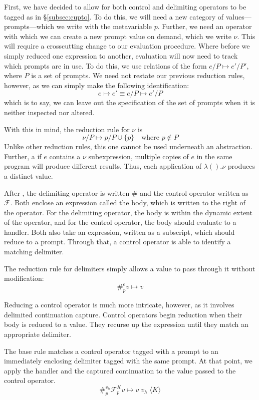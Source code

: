 \documentclass[11pt]{article}
\newcommand\F{\mathcal{F}}
\newcommand{\angles}[1]{\langle#1\rangle}
\begin{document}
First, we have decided to allow for both control and delimiting operators to be tagged as in \S\ref{subsec:cupto}.
To do this, we will need a new category of values---prompts---which we write with the metavariable $p$.
Further, we need an operator with which we can create a new prompt value on demand, which we write $\nu$.
This will require a crosscutting change to our evaluation procedure.
Where before we simply reduced one expression to another, evaluation will now need to track which prompts are in use.
To do this, we use relations of the form $e/P \mapsto e'/P'$, where $P$ is a set of prompts.
We need not restate our previous reduction rules, however, as we can simply make the following identification:
$$e \mapsto e' \equiv e/P \mapsto e'/P$$
which is to say, we can leave out the specification of the set of prompts when it is neither inspected nor altered.

With this in mind, the reduction rule for $\nu$ is
$$\nu/P \mapsto p/P\cup\{p\} \quad\textrm{where }p \notin P$$
Unlike other reduction rules, this one cannot be used underneath an abstraction.
Further, a if $e$ contains a $\nu$ subexpression, multiple copies of $e$ in the same program will produce different results.
Thus, each application of $\lambda().\nu$ produces a distinct value.


After \cite{PromptApplication}, the delimiting operator is written $\#$ and the control operator written as $\F$.
Both enclose an expression called the body, which is written to the right of the operator.
For the delimiting operator, the body is within the dynamic extent of the operator, and for the control operator, the body should evaluate to a handler.
Both also take an expression, written as a subscript, which should reduce to a prompt. Through that, a control operator is able to identify a matching delimiter.

The reduction rule for delimiters simply allows a value to pass through it without modification:
$$\#_p^e v \mapsto v$$

Reducing a control operator is much more intricate, however, as it involves delimited continuation capture.
Control operators begin reduction when their body is reduced to a value.
They recurse up the expression until they match an appropriate delimiter.

The base rule matches a control operator tagged with a prompt to an immediately enclosing delimiter tagged with the same prompt.
At that point, we apply the handler and the captured continuation to the value passed to the control operator.
$$\#_p^{v_h}\F_p^Kv \mapsto v\;v_h\;\angles K$$
\end{document}
